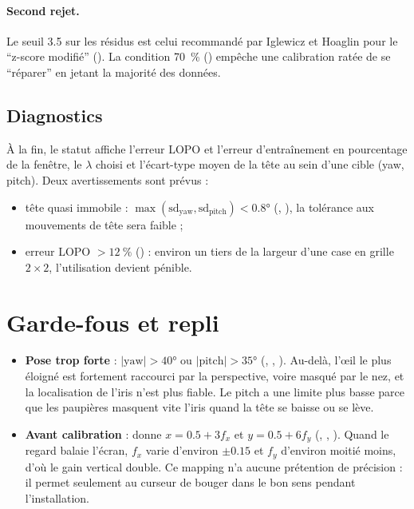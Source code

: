 \paragraph{Second rejet.} Le seuil \num{3.5} sur les résidus est celui recommandé par Iglewicz et Hoaglin pour le \enquote{z-score modifié} \cite{iglewicz1993} (\litt). La condition \qty{70}{\percent} (\empi) empêche une calibration ratée de se \enquote{réparer} en jetant la majorité des données.

\subsection{Diagnostics}

À la fin, le statut affiche l'erreur LOPO et l'erreur d'entraînement en pourcentage de la fenêtre, le $\lambda$ choisi et l'écart-type moyen de la tête au sein d'une cible (yaw, pitch). Deux avertissements sont prévus :
\begin{itemize}
  \item tête quasi immobile : $\max(\text{sd}_\text{yaw}, \text{sd}_\text{pitch}) < \ang{0.8}$ (, \empi), la tolérance aux mouvements de tête sera faible ;
  \item erreur LOPO $> \qty{12}{\percent}$ (\empi) : environ un tiers de la largeur d'une case en grille $2\times2$, l'utilisation devient pénible.
\end{itemize}

\section{Garde-fous et repli}

\begin{itemize}
  \item \textbf{Pose trop forte} : $|\text{yaw}| > \ang{40}$ ou $|\text{pitch}| > \ang{35}$ (, , \empi). Au-delà, l'œil le plus éloigné est fortement raccourci par la perspective, voire masqué par le nez, et la localisation de l'iris n'est plus fiable. Le pitch a une limite plus basse parce que les paupières masquent vite l'iris quand la tête se baisse ou se lève.
  \item \textbf{Avant calibration} :  donne $x = \num{0.5} + 3 f_x$ et $y = \num{0.5} + 6 f_y$ (, , \empi). Quand le regard balaie l'écran, $f_x$ varie d'environ $\pm\num{0.15}$ et $f_y$ d'environ moitié moins, d'où le gain vertical double. Ce mapping n'a aucune prétention de précision : il permet seulement au curseur de bouger dans le bon sens pendant l'installation.
\end{itemize}

